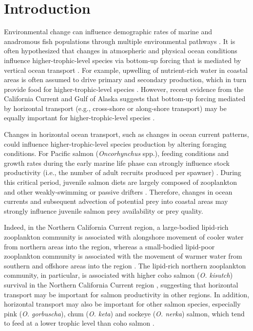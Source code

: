 \section{Introduction}

Environmental change can influence demographic rates of marine and anadromous
fish populations through multiple environmental pathways \citep{Ottersen2010a,
Drinkwater2010a}. It is often hypothesized that changes in atmospheric and
physical ocean conditions influence higher-trophic-level species via bottom-up
forcing that is mediated by vertical ocean transport \citep{Malick2015b,
DiLorenzo2013b, Ottersen2010a}. For example, upwelling of nutrient-rich water in
coastal areas is often assumed to drive primary and secondary production, which
in turn provide food for higher-trophic-level species \citep{Rykaczewski2008a}.
However, recent evidence from the California Current \citep{Bi2011b,
Keister2011a, Sydeman2011a} and Gulf of Alaska \citep{Stabeno2004a, Combes2009a,
Kline2010, Kline2008a} suggests that bottom-up forcing mediated by horizontal
transport (e.g., cross-shore or along-shore transport) may be equally important
for higher-trophic-level species \citep{DiLorenzo2013b}.

Changes in horizontal ocean transport, such as changes in ocean current
patterns, could influence higher-trophic-level species production by altering
foraging conditions. For Pacific salmon (\emph{Oncorhynchus} spp.), feeding
conditions and growth rates during the early marine life phase can strongly
influence stock productivity (i.e., the number of adult recruits produced per
spawner) \citep{McGurk1996a, Farley2007b, Duffy2011, Malick2011a}. During this
critical period, juvenile salmon diets are largely composed of zooplankton and
other weakly-swimming or passive drifters \citep{Armstrong2008a, Beauchamp2007a,
Brodeur2007a}. Therefore, changes in ocean currents and subsequent advection of
potential prey into coastal areas may strongly influence juvenile salmon prey
availability or prey quality.

Indeed, in the Northern California Current region, a large-bodied lipid-rich
zooplankton community is associated with alongshore movement of cooler water
from northern areas into the region, whereas a small-bodied lipid-poor
zooplankton community is associated with the movement of warmer water from
southern and offshore areas into the region \citep{Bi2011b, Keister2011a}. The
lipid-rich northern zooplankton community, in particular, is associated with
higher coho salmon (\emph{O. kisutch}) survival in the Northern California
Current region \citep{Bi2011a}, suggesting that horizontal transport may be
important for salmon productivity in other regions. In addition, horizontal
transport may also be important for other salmon species, especially pink
(\emph{O. gorbuscha}), chum (\emph{O. keta}) and sockeye (\emph{O. nerka})
salmon, which tend to feed at a lower trophic level than coho salmon
\citep{Brodeur2007}.

